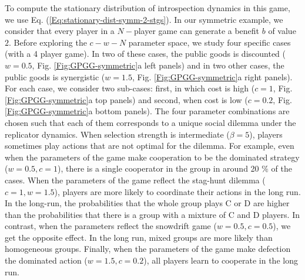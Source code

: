 \documentclass[11pt]{article}
\theoremstyle{plainCl1}
\theoremstyle{plainCl2}
\newcommand{\C}{\mathrm{C}}
\newcommand{\D}{\mathrm{D}}
\begin{document}
\noindent To compute the stationary distribution of introspection dynamics in this game, we use Eq. (\ref{Eq:stationary-dist-symm-2-stgs}). In our symmetric example, we consider that every player in a $N-$player game can generate a benefit $b$ of value $2$. Before exploring the $c-w-N$ parameter space, we study four specific cases (with a 4 player game).  In two of these cases, the public goods is discounted ($w = 0.5$, Fig. \ref{Fig:GPGG-symmetric}a left panels) and in two other cases, the public goods is synergistic ($w = 1.5$, Fig. \ref{Fig:GPGG-symmetric}a right panels). For each case, we consider two sub-cases: first, in which cost is high ($c = 1$,  Fig. \ref{Fig:GPGG-symmetric}a top panels) and second, when cost is low ($c = 0.2$, Fig. \ref{Fig:GPGG-symmetric}a bottom panels). The four parameter combinations are chosen such that each of them corresponds to a unique social dilemma under the replicator dynamics.  
When selection strength is intermediate ($\beta = 5$), players sometimes play actions that are not optimal for the dilemma. For example, even when the parameters of the game make cooperation to be the dominated strategy ($w = 0.5, c = 1$), there is a single cooperator in the group in around 20 $\%$ of the cases. When the parameters of the game reflect the stag-hunt dilemma ($c = 1, w = 1.5$), players are more likely to coordinate their actions in the long run. In the long-run, the probabilities that the whole group plays $\C$ or $\D$ are higher than the probabilities that there is a group with a mixture of $\C$ and $\D$ players. In contrast, when the parameters reflect the snowdrift game ($w = 0.5, c = 0.5$), we get the opposite effect. In the long run, mixed groups are more likely than homogeneous groups. Finally, when the parameters of the game make defection the dominated action ($w = 1.5, c = 0.2$), all players learn to cooperate in the long run. \\ \\ 
\end{document}
